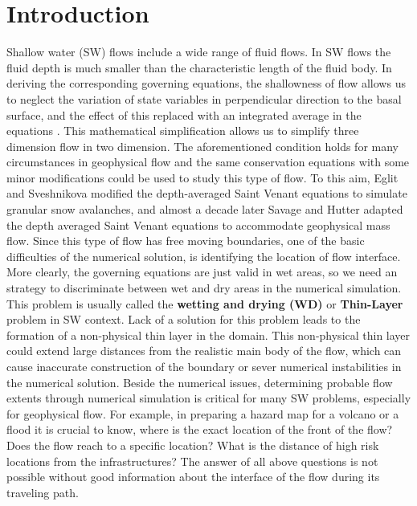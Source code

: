 \documentclass[letterpaper,10pt]{article}
\begin{document}
\section{Introduction} 
\label{introduction}
Shallow water (SW) flows include a wide range of fluid flows. In SW flows the fluid depth is much 
smaller than the characteristic length of the fluid body. In deriving the corresponding 
governing equations, the shallowness of flow allows us to neglect the variation of state variables  in perpendicular direction to the basal surface, and the effect of 
this replaced with an integrated average in the equations \cite{SavageHutter1989}. 
This mathematical simplification allows us to simplify three dimension flow in two dimension.
The aforementioned condition holds for many circumstances in geophysical flow and the same 
conservation equations with some minor modifications could be used to study this type of flow. \newline
To this aim, Eglit and Sveshnikova \cite{eglit1980mms} modified the depth-averaged Saint Venant equations to simulate granular snow avalanches, and almost a decade later Savage and Hutter \cite{SavageHutter1989} adapted the depth averaged Saint Venant equations to accommodate  geophysical mass flow. 
Since this type of flow has free moving boundaries, one of the basic difficulties 
of the numerical solution, is identifying the location of flow interface. 
More clearly, the governing equations are just valid in wet areas, so we need an strategy to discriminate between wet and dry areas in the numerical simulation. 
This problem is usually called the {\bf wetting and drying (WD)} or {\bf Thin-Layer} problem in SW context. Lack of a solution for this problem leads to the formation of a non-physical thin layer in the domain.
This non-physical thin layer could extend large distances from the realistic main 
body of the flow, which can cause inaccurate construction of the boundary or sever 
numerical instabilities in the numerical solution.\newline
Beside the numerical issues, determining probable flow extents through numerical simulation is critical for many SW problems, especially for geophysical flow. For example, in preparing a hazard map for a volcano or a flood it is crucial to know, where is the exact location of the front of the flow? Does the flow reach to a specific location? What is the distance of high risk locations from the infrastructures? \newline
The answer of all above questions is not possible without good information about the interface of the flow during its traveling path.\newline
\end{document}
